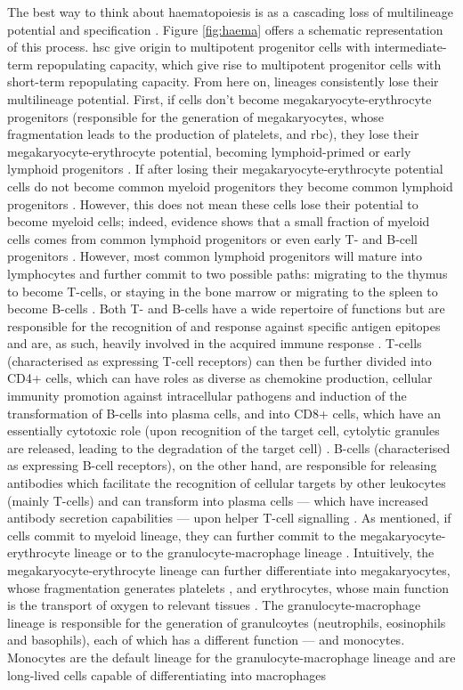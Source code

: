 The best way to think about haematopoiesis is as a cascading loss of multilineage potential and specification \cite{Rieger2012-bh}. Figure \ref{fig:haema} offers a schematic representation of this process. \ac{hsc} give origin to multipotent progenitor cells with intermediate-term repopulating capacity, which give rise to multipotent progenitor cells with short-term repopulating capacity. From here on, lineages consistently lose their multilineage potential. First, if cells don’t become megakaryocyte-erythrocyte progenitors (responsible for the generation of megakaryocytes, whose fragmentation leads to the production of platelets, and \ac{rbc}), they lose their megakaryocyte-erythrocyte potential, becoming lymphoid-primed or early lymphoid progenitors \cite{Adolfsson2005-iq}. If after losing their megakaryocyte-erythrocyte potential cells do not become common myeloid progenitors they become common lymphoid progenitors \cite{Kondo1997-fb}. However, this does not mean these cells lose their potential to become myeloid cells; indeed, evidence shows that a small fraction of myeloid cells comes from common lymphoid progenitors or even early T- and B-cell progenitors \cite{Schlenner2010-ga,Kawamoto2010-yp}. However, most common lymphoid progenitors will mature into lymphocytes and further commit to two possible paths: migrating to the thymus to become T-cells, or staying in the bone marrow or migrating to the spleen to become B-cells \cite{Inlay2009-as}. Both T- and B-cells have a wide repertoire of functions but are responsible for the recognition of and response against specific antigen epitopes and are, as such, heavily involved in the acquired immune response \cite{Cano2013-gu}. T-cells (characterised as expressing T-cell receptors) can then be further divided into CD4+ cells, which can have roles as diverse as chemokine production, cellular immunity promotion against intracellular pathogens and induction of the transformation of B-cells into plasma cells, and into CD8+ cells, which have an essentially cytotoxic role (upon recognition of the target cell, cytolytic granules are released, leading to the degradation of the target cell) \cite{Cano2013-gu}. B-cells (characterised as expressing B-cell receptors), on the other hand, are responsible for releasing antibodies which facilitate the recognition of cellular targets by other leukocytes (mainly T-cells) and can transform into plasma cells --- which have increased antibody secretion capabilities --- upon helper T-cell signalling \cite{Cano2013-gu,Janeway2001-mb}. As mentioned, if cells commit to myeloid lineage, they can further commit to the megakaryocyte-erythrocyte lineage or to the granulocyte-macrophage lineage \cite{Akashi2000-ck}. Intuitively, the megakaryocyte-erythrocyte lineage can further differentiate into megakaryocytes, whose fragmentation generates platelets \cite{Wright1906-af}, and erythrocytes, whose main function is the transport of oxygen to relevant tissues \cite{Jensen2009-be}. The granulocyte-macrophage lineage is responsible for the generation of granulcoytes (neutrophils, eosinophils and basophils), each of which has a different function --- and monocytes. Monocytes are the default lineage for the granulocyte-macrophage lineage and are long-lived cells capable of differentiating into macrophages 